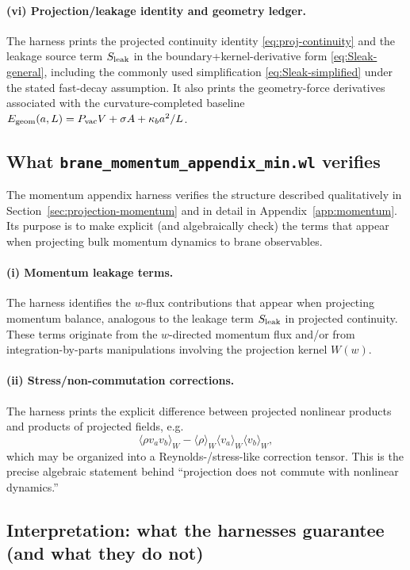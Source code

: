 \documentclass[11pt]{article}
\newcommand{\kappab}{\kappa_b}
\begin{document}
\paragraph{(vi) Projection/leakage identity and geometry ledger.}
The harness prints the projected continuity identity \eqref{eq:proj-continuity} and the leakage source term $S_{\rm leak}$ in the boundary+kernel-derivative form \eqref{eq:Sleak-general}, including the commonly used simplification \eqref{eq:Sleak-simplified} under the stated fast-decay assumption. It also prints the geometry-force derivatives associated with the curvature-completed baseline $E_{\rm geom}(a,L)=P_{\rm vac}V+\sigma A+\kappab a^2/L$.

\subsection{What \texttt{brane\_momentum\_appendix\_min.wl} verifies}
\label{app:wl-momentum}

The momentum appendix harness verifies the structure described qualitatively in Section~\ref{sec:projection-momentum} and in detail in Appendix~\ref{app:momentum}. Its purpose is to make explicit (and algebraically check) the terms that appear when projecting bulk momentum dynamics to brane observables.

\paragraph{(i) Momentum leakage terms.}
The harness identifies the $w$-flux contributions that appear when projecting momentum balance, analogous to the leakage term $S_{\rm leak}$ in projected continuity. These terms originate from the $w$-directed momentum flux and/or from integration-by-parts manipulations involving the projection kernel $W(w)$.

\paragraph{(ii) Stress/non-commutation corrections.}
The harness prints the explicit difference between projected nonlinear products and products of projected fields, e.g.
\[
\langle \rho v_a v_b\rangle_W - \langle \rho\rangle_W \langle v_a\rangle_W\langle v_b\rangle_W,
\]
which may be organized into a Reynolds-/stress-like correction tensor. This is the precise algebraic statement behind “projection does not commute with nonlinear dynamics.”

\subsection{Interpretation: what the harnesses guarantee (and what they do not)}
\label{app:wl-interpret}
\end{document}

